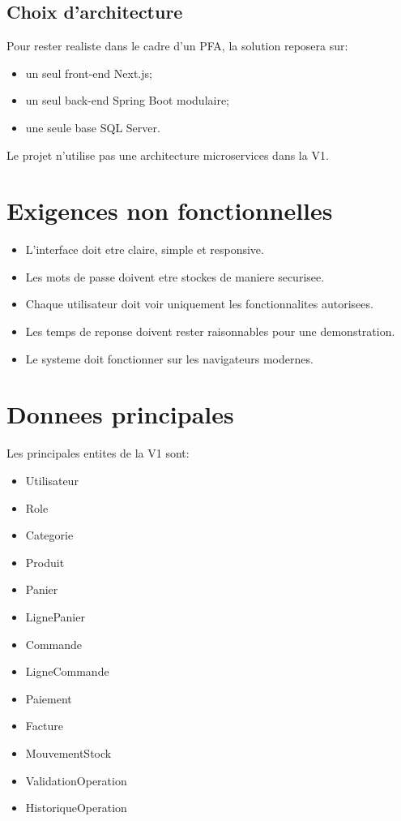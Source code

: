 \documentclass[12pt,a4paper]{article}
\begin{document}
\subsection{Choix d'architecture}
Pour rester realiste dans le cadre d'un PFA, la solution reposera sur:
\begin{itemize}
  \item un seul front-end Next.js;
  \item un seul back-end Spring Boot modulaire;
  \item une seule base SQL Server.
\end{itemize}

Le projet n'utilise pas une architecture microservices dans la V1.

\section{Exigences non fonctionnelles}
\begin{itemize}
  \item L'interface doit etre claire, simple et responsive.
  \item Les mots de passe doivent etre stockes de maniere securisee.
  \item Chaque utilisateur doit voir uniquement les fonctionnalites autorisees.
  \item Les temps de reponse doivent rester raisonnables pour une demonstration.
  \item Le systeme doit fonctionner sur les navigateurs modernes.
\end{itemize}

\section{Donnees principales}
Les principales entites de la V1 sont:
\begin{itemize}
  \item Utilisateur
  \item Role
  \item Categorie
  \item Produit
  \item Panier
  \item LignePanier
  \item Commande
  \item LigneCommande
  \item Paiement
  \item Facture
  \item MouvementStock
  \item ValidationOperation
  \item HistoriqueOperation
\end{itemize}
\end{document}
